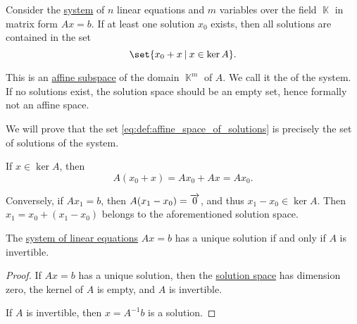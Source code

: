 \begin{definition}\label{def:affine_space_of_solutions}\mimprovised
  Consider the \hyperref[rem:system_of_equations]{system} of \( n \) linear equations and \( m \) variables over the field \( \BbbK \) in matrix form \( Ax = b \). If at least one solution \( x_0 \) exists, then all solutions are contained in the set
  \begin{equation}\label{eq:def:affine_space_of_solutions}
    \set{ x_0 + x \given x \in \ker A }.
  \end{equation}

  This is an \hyperref[def:affine_subspace]{affine subspace} of the domain \( \BbbK^m \) of \( A \). We call it the  of the system. If no solutions exist, the solution space should be an empty set, hence formally not an affine space.
\end{definition}
\begin{defproof}
  We will prove that the set \eqref{eq:def:affine_space_of_solutions} is precisely the set of solutions of the system.

  If \( x \in \ker A \), then
  \begin{equation*}
    A(x_0 + x) = Ax_0 + Ax = Ax_0.
  \end{equation*}

  Conversely, if \( Ax_1 = b \), then \( A(x_1 - x_0) = \overrightarrow{0} \), and thus \( x_1 - x_0 \in \ker A \). Then \( x_1 = x_0 + (x_1 - x_0) \) belongs to the aforementioned solution space.
\end{defproof}

\begin{proposition}\label{thm:system_of_equations_unique_solution}
  The \hyperref[rem:system_of_equations]{system of linear equations} \( Ax = b \) has a unique solution if and only if \( A \) is invertible.
\end{proposition}
\begin{proof}
  \SufficiencySubProof If \( Ax = b \) has a unique solution, then the \hyperref[def:affine_space_of_solutions]{solution space} has dimension zero, the kernel of \( A \) is empty, and \( A \) is invertible.

  \NecessitySubProof If \( A \) is invertible, then \( x = A^{-1} b \) is a solution.
\end{proof}

